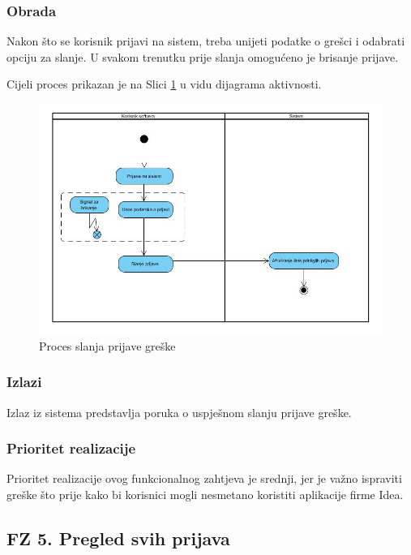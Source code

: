 \documentclass[12pt,a4paper]{article}
\begin{document}
\subsubsection{Obrada}

Nakon što se korisnik prijavi na sistem, treba unijeti podatke o grešci i odabrati opciju za slanje. U svakom trenutku prije slanja omogućeno je brisanje prijave.

Cijeli proces prikazan je na Slici \ref{act4} u vidu dijagrama aktivnosti.

\begin{figure}[H]
\center
\includegraphics[scale=0.5]{../res/Activity/activity4.JPG}
\caption{Proces slanja prijave greške}
\label{act4}
\end{figure}

\subsubsection{Izlazi}

Izlaz iz sistema predstavlja poruka o uspješnom slanju prijave greške.

\subsubsection{Prioritet realizacije}

Prioritet realizacije ovog funkcionalnog zahtjeva je srednji, jer je važno ispraviti greške što prije kako bi korisnici mogli nesmetano koristiti aplikacije firme Idea.

\subsection{FZ 5. Pregled svih prijava}
\end{document}

